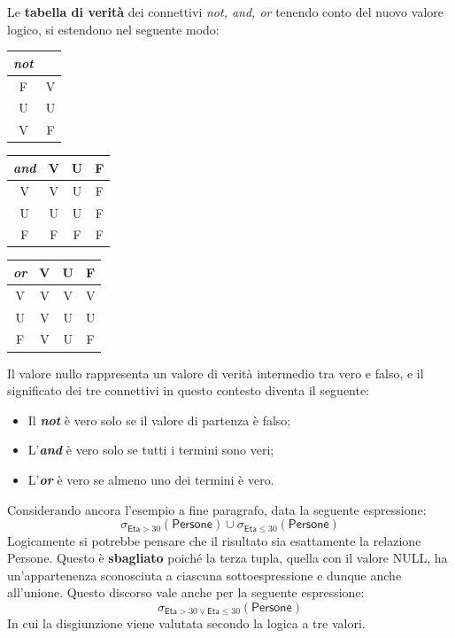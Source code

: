 \documentclass[a4paper]{article}
\begin{document}
	\noindent
	Le \textbf{tabella di verità} dei connettivi \emph{not, and, or} tenendo conto del nuovo valore logico, si estendono nel seguente modo:
	\begin{table}[!htbp]
		\centering
		\begin{tabular}{@{} c | c @{}}
			\toprule
			\emph{not} & \phantom{\emph{not}} \\
			\midrule
			F & V \\
			U & U \\
			V & F \\
			\bottomrule
		\end{tabular}
		\hspace{3em}
		\begin{tabular}{@{} c | c c c @{}}
			\toprule
			\emph{and} & V & U & F \\
			\midrule
			V & V & U & F \\
			U & U & U & F \\
			F & F & F & F \\
			\bottomrule
		\end{tabular}
		\hspace{3em}
		\begin{tabular}{@{} c | c c c @{}}
			\toprule
			\emph{or} & V & U & F \\
			\midrule
			V & V & V & V \\
			U & V & U & U \\
			F & V & U & F \\
			\bottomrule
		\end{tabular}
	\end{table}
	Il valore nullo rappresenta un valore di verità intermedio tra vero e falso, e il significato dei tre connettivi in questo contesto diventa il seguente:
	\begin{itemize}
		\item Il \textbf{\emph{not}} è vero solo se il valore di partenza è falso;
		
		\item L'\textbf{\emph{and}} è vero solo se tutti i termini sono veri;
		
		\item L'\textbf{\emph{or}} è vero se almeno uno dei termini è vero.
	\end{itemize}
	Considerando ancora l'esempio a fine paragrafo, data la seguente espressione:
	\begin{equation*}
		\sigma_{\textsf{Eta} > 30}\left(\textsf{Persone}\right) \cup \sigma_{\textsf{Eta} \le 30}\left(\textsf{Persone}\right)
	\end{equation*}
	Logicamente si potrebbe pensare che il risultato sia esattamente la relazione \textsf{Persone}. Questo è \textbf{sbagliato} poiché la terza tupla, quella con il valore \textsf{NULL}, ha un'appartenenza sconosciuta a ciascuna sottoespressione e dunque anche all'unione. Questo discorso vale anche per la seguente espressione:
	\begin{equation*}
		\sigma_{\textsf{Eta} > 30 \lor \textsf{Eta} \le 30}\left(\textsf{Persone}\right)
	\end{equation*}
	In cui la disgiunzione viene valutata secondo la logica a tre valori.\newline
	
\end{document}
